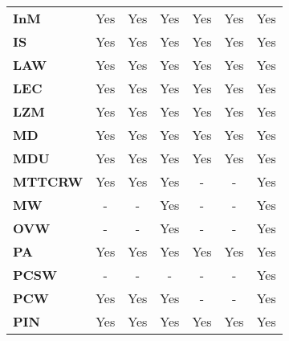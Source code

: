 \begin{table}[ht!]
\begin{tabular}{lcccccc}
\textbf{InM}         & Yes           & Yes                & Yes            & Yes                     & Yes                     & Yes            \\
\textbf{IS}          & Yes           & Yes                & Yes            & Yes                     & Yes                     & Yes            \\
\textbf{LAW}         & Yes           & Yes                & Yes            & Yes                     & Yes                     & Yes            \\
\textbf{LEC}         & Yes           & Yes                & Yes            & Yes                     & Yes                     & Yes            \\
\textbf{LZM}         & Yes           & Yes                & Yes            & Yes                     & Yes                     & Yes            \\
\textbf{MD}          & Yes           & Yes                & Yes            & Yes                     & Yes                     & Yes            \\
\textbf{MDU}         & Yes           & Yes                & Yes            & Yes                     & Yes                     & Yes            \\
\textbf{MTTCRW}      & Yes           & Yes                & Yes            & -                       & -                       & Yes            \\
\textbf{MW}          & -             & -                  & Yes            & -                       & -                       & Yes            \\
\textbf{OVW}         & -             & -                  & Yes            & -                       & -                       & Yes            \\
\textbf{PA}          & Yes           & Yes                & Yes            & Yes                     & Yes                     & Yes            \\
\textbf{PCSW}        & -             & -                  & -              & -                       & -                       & Yes            \\
\textbf{PCW}         & Yes           & Yes                & Yes            & -                       & -                       & Yes            \\
\textbf{PIN}         & Yes           & Yes                & Yes            & Yes                     & Yes                     & Yes            \\

\end{tabular}
\end{table}
